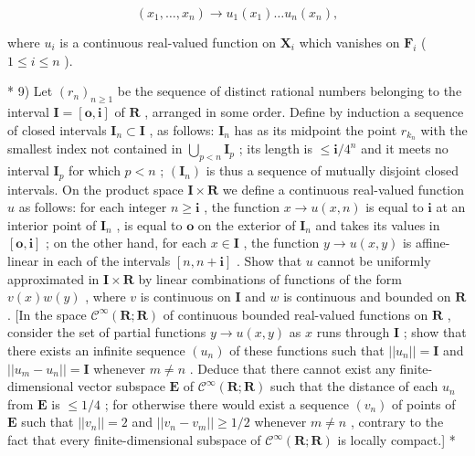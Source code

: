 \[
(x _ {1}, \dots , x _ {n}) \rightarrow u _ {1} (x _ {1}) \dots u _ {n} (x _ {n}),
\]

where \(u_{i}\) is a continuous real-valued function on \(\mathbf{X}_i\) which vanishes on \(\mathbf{F}_i\) ( \(1 \leqslant i \leqslant n\) ).

* 9) Let \((r_n)_{n \geqslant 1}\) be the sequence of distinct rational numbers belonging to the interval \(\mathbf{I} = [\mathbf{o}, \mathbf{i}]\) of \(\mathbf{R}\) , arranged in some order. Define by induction a sequence of closed intervals \(\mathbf{I}_n \subset \mathbf{I}\) , as follows: \(\mathbf{I}_n\) has as its midpoint the point \(r_{k_n}\) with the smallest index not contained in \(\bigcup_{p < n} \mathbf{I}_p\) ; its length is \(\leqslant \mathbf{i}/4^n\) and it meets no interval \(\mathbf{I}_p\) for which \(p < n\) ; \((\mathbf{I}_n)\) is thus a sequence of mutually disjoint closed intervals. On the product space \(\mathbf{I} \times \mathbf{R}\) we define a continuous real-valued function \(u\) as follows: for each integer \(n \geqslant \mathbf{i}\) , the function \(x \to u(x, n)\) is equal to \(\mathbf{i}\) at an interior point of \(\mathbf{I}_n\) , is equal to \(\mathbf{o}\) on the exterior of \(\mathbf{I}_n\) and takes its values in \([\mathbf{o}, \mathbf{i}]\) ; on the other hand, for each \(x \in \mathbf{I}\) , the function \(y \to u(x, y)\) is affine-linear in each of the intervals \([n, n + \mathbf{i}]\) . Show that \(u\) cannot be uniformly approximated in \(\mathbf{I} \times \mathbf{R}\) by linear combinations of functions of the form \(v(x)w(y)\) , where \(v\) is continuous on \(\mathbf{I}\) and \(w\) is continuous and bounded on \(\mathbf{R}\) . {[}In the space \(\mathcal{C}^\infty(\mathbf{R}; \mathbf{R})\) of continuous bounded real-valued functions on \(\mathbf{R}\) , consider the set of partial functions \(y \to u(x, y)\) as \(x\) runs through \(\mathbf{I}\) ; show that there exists an infinite sequence \((u_n)\) of these functions such that \(||u_n|| = \mathbf{I}\) and \(||u_m - u_n|| = \mathbf{I}\) whenever \(m \neq n\) . Deduce that there cannot exist any finite-dimensional vector subspace \(\mathbf{E}\) of \(\mathcal{C}^\infty(\mathbf{R}; \mathbf{R})\) such that the distance of each \(u_n\) from \(\mathbf{E}\) is \(\leqslant 1/4\) ; for otherwise there would exist a sequence \((v_n)\) of points of \(\mathbf{E}\) such that \(||v_n|| = 2\) and \(||v_n - v_m|| \geqslant 1/2\) whenever \(m \neq n\) , contrary to the fact that every finite-dimensional subspace of \(\mathcal{C}^\infty(\mathbf{R}; \mathbf{R})\) is locally compact.{]} *

